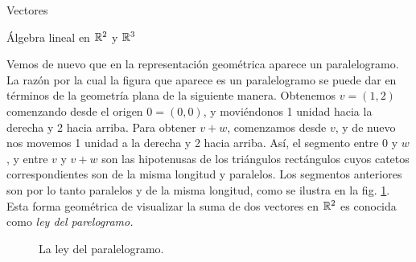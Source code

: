 \begin{chapter}{Vectores}
\begin{section}{\'Algebra lineal en $\mathbb R^2$ y $\mathbb R^3$}
\begin{ejemplo*}
        Vemos de nuevo que en la representación geométrica aparece un paralelogramo. La razón por la cual la figura que aparece es un paralelogramo se puede dar en 	términos de la geometría plana de la siguiente manera. Obtenemos $v = (1, 2)$ comenzando desde el origen $0 = (0, 0)$, y moviéndonos 1 unidad hacia la derecha y 2 hacia arriba. Para obtener $v+w$, comenzamos desde $v$, y de nuevo nos movemos 1 unidad a la derecha y 2 hacia arriba. Así, el segmento entre 0 y $w$, y entre $v$ y $v+w$ son las hipotenusas de los triángulos rectángulos cuyos catetos  correspondientes son de la misma longitud y paralelos. Los segmentos anteriores son por lo tanto paralelos y de la misma longitud, como se ilustra en la fig. \ref{fig-ley-del-paralelogramo-3}. Esta forma geométrica de visualizar la suma de dos vectores en $\mathbb R^2$  es conocida como \textit{ley del parelogramo.}
        \begin{figure}[h]
        	\centering
            \caption{La ley del paralelogramo.}\label{fig-ley-del-paralelogramo-3}
        \end{figure}
    \end{ejemplo*}
    

\end{section}
\end{chapter}
